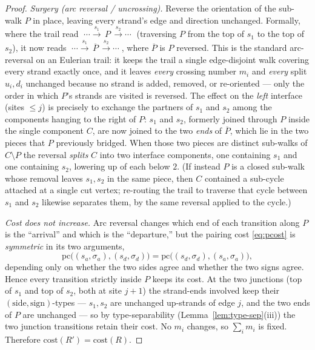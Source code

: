 \begin{proof}
\emph{Surgery (arc reversal / uncrossing).}  Reverse the orientation of the
sub-walk $P$ in place, leaving every strand's edge and direction unchanged.
Formally, where the trail read
$\;\cdots\xrightarrow{\,s_1\,}\,P\,\xrightarrow{\,s_2\,}\cdots\;$
(traversing $P$ from the top of $s_1$ to the top of $s_2$), it now reads
$\;\cdots\xrightarrow{\,s_1\,}\,\overline P\,\xrightarrow{\,s_2\,}\cdots\;$,
where $\overline P$ is $P$ reversed.  This is the standard arc-reversal on an
Eulerian trail: it keeps the trail a single edge-disjoint walk covering every
strand exactly once, and it leaves \emph{every} crossing number $m_i$ and
\emph{every} split $u_i,d_i$ unchanged because no strand is added, removed, or
re-oriented --- only the order in which $P$'s strands are visited is reversed.
The effect on the \emph{left} interface (sites $\le j$) is precisely to
exchange the partners of $s_1$ and $s_2$ among the components hanging to the
right of $P$: $s_1$ and $s_2$, formerly joined through $P$ inside the single
component $C$, are now joined to the two \emph{ends} of $\overline P$, which
lie in the two pieces that $P$ previously bridged.  When those two pieces are
distinct sub-walks of $C\setminus P$ the reversal \emph{splits} $C$ into two
interface components, one containing $s_1$ and one containing $s_2$, lowering
$\mathrm{up}$ of each below $2$.  (If instead $P$ is a closed sub-walk whose
removal leaves $s_1,s_2$ in the same piece, then $C$ contained a sub-cycle
attached at a single cut vertex; re-routing the trail to traverse that cycle
between $s_1$ and $s_2$ likewise separates them, by the same reversal applied
to the cycle.)

\emph{Cost does not increase.}  Arc reversal changes which end of each
transition along $P$ is the ``arrival'' and which is the ``departure,'' but
the pairing cost \eqref{eq:pcost} is \emph{symmetric} in its two arguments,
\[
\mathrm{pc}\bigl((s_a,\sigma_a),(s_d,\sigma_d)\bigr)
 =\mathrm{pc}\bigl((s_d,\sigma_d),(s_a,\sigma_a)\bigr),
\]
depending only on whether the two sides agree and whether the two signs
agree.  Hence every transition strictly inside $P$ keeps its cost.  At the two
junctions (top of $s_1$ and top of $s_2$, both at site $j+1$) the strand-ends
involved keep their $(\text{side},\text{sign})$-types --- $s_1,s_2$ are
unchanged up-strands of edge $j$, and the two ends of $P$ are unchanged ---
so by type-separability (Lemma~\ref{lem:type-sep}(iii)) the two junction
transitions retain their cost.  No $m_i$ changes, so $\sum_i m_i$ is fixed.
Therefore $\mathrm{cost}(R')=\mathrm{cost}(R)$.


\end{proof}
